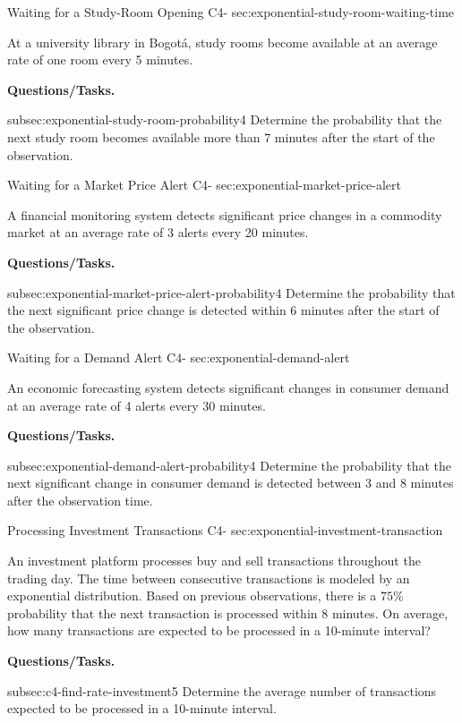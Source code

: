 	
	\sectionScored
	{Waiting for a Study-Room Opening}
	{C4-}
	{sec:exponential-study-room-waiting-time}
	{
		At a university library in Bogotá, study rooms become available at an
		average rate of one room every 5 minutes. 
		
		\textbf{Questions/Tasks.}
		\begin{enumerate}
			\CriterionTask
			{subsec:exponential-study-room-probability}{4}
			{Determine the probability that the next study room becomes available more than 7 minutes after the start of the observation. }
		\end{enumerate}
		
	}
	
	
	\sectionScored
	{Waiting for a Market Price Alert}
	{C4-\sml{5}}
	{sec:exponential-market-price-alert}
	{
		A financial monitoring system detects significant price changes in a
		commodity market at an average rate of 3 alerts every 20 minutes.
		
		\textbf{Questions/Tasks.}
		\begin{enumerate}
			\CriterionTask
			{subsec:exponential-market-price-alert-probability}{4}
			{Determine the probability that the next significant price change
				is detected within 6 minutes after the start of the observation.
				\score{4}}
		\end{enumerate}
		
	}

	\sectionScored
	{Waiting for a Demand Alert}
	{C4-}
	{sec:exponential-demand-alert}
	{
		An economic forecasting system detects significant changes in consumer
		demand at an average rate of 4 alerts every 30 minutes.
		
		\textbf{Questions/Tasks.}
		\begin{enumerate}
			\CriterionTask
			{subsec:exponential-demand-alert-probability}{4}
			{Determine the probability that the next significant change in
				consumer demand is detected between 3 and 8 minutes after the
				observation time.
				}
		\end{enumerate}
		
	}

	
	
	\sectionScored
	{Processing Investment Transactions}
	{C4-\sml{5}}
	{sec:exponential-investment-transaction}
	{
		An investment platform processes buy and sell transactions throughout
		the trading day. The time between consecutive transactions is modeled
		by an exponential distribution. Based on previous observations, there
		is a \(75\%\) probability that the next transaction is processed within
		8 minutes. On average, how many transactions are expected to be
		processed in a 10-minute interval?
		
		\textbf{Questions/Tasks.}
		\begin{enumerate}
			\CriterionTask
			{subsec:c4-find-rate-investment}{5}
			{Determine the average number of transactions expected to be
				processed in a 10-minute interval.
				\score{5}}
		\end{enumerate}
		
	}

